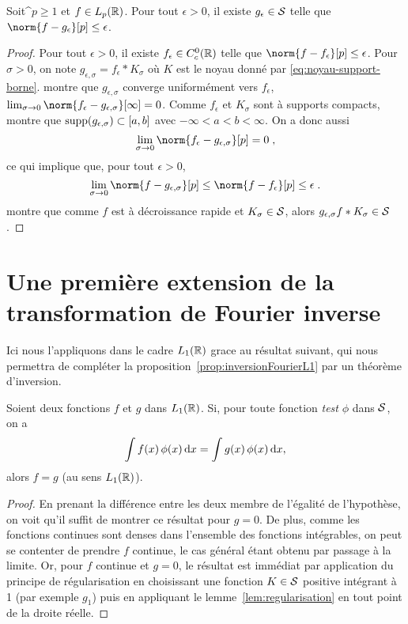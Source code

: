 \begin{theorem}
\label{theo:densite-mcs-Lp}
Soit^$p \geq 1$ et $f \in L_p(\mathbb{R})$. Pour tout $\epsilon > 0$, il existe $g_\epsilon \in \mathcal{S}$ telle que 
$\norm{f - g_\epsilon}[p] \leq \epsilon$.
\end{theorem}
\begin{proof}
Pour tout $\epsilon > 0$, il existe $f_\epsilon \in C_c^0(\mathbb{R})$ telle que $\norm{f - f_\epsilon}[p] \leq \epsilon$.
Pour $\sigma > 0$, on note $g_{\epsilon,\sigma} = f_\epsilon * K_\sigma$ où $K$ est le noyau donn\'e par \eqref{eq:noyau-support-borne}.  montre que $g_{\epsilon,\sigma}$ converge uniform\'ement vers $f_\epsilon$, \ie\ $\lim_{\sigma \to 0} \norm{f_\epsilon - g_{\epsilon,\sigma}}[\infty]= 0$. Comme $f_\epsilon$ et $K_\sigma$ sont à supports compacts,  montre que $\mathrm{supp}(g_{\epsilon,\sigma}) \subset \left[a,b\right]$ avec $-\infty < a < b < \infty$.
On a donc aussi 
$$
\lim_{\sigma \to 0} \norm{f_\epsilon - g_{\epsilon,\sigma}}[p] = 0 \eqsp,
$$
ce qui implique que, pour tout $\epsilon > 0$, 
$$
\lim_{\sigma \to 0} \norm{f - g_{\epsilon,\sigma}}[p] \leq \norm{f-f_\epsilon}[p] \leq \epsilon \eqsp.
$$
 montre que comme $f$ est à d\'ecroissance rapide et $K_\sigma \in \mathcal{S}$, alors $g_{\epsilon,\sigma} f * K_\sigma \in \mathcal{S}$.
\end{proof}


\section{Une premi\`ere extension de la transformation de Fourier inverse}
Ici nous l'appliquons dans le cadre $L_1(\mathbb{R})$ grace au r{\'e}sultat suivant, qui nous permettra de compl{\'e}ter la
proposition~\ref{prop:inversionFourierL1} par un th{\'e}or{\`e}me d'inversion.
\begin{proposition}\label{prop:DualiteSchwartz}
Soient deux fonctions $f$ et $g$ dans $L_1(\mathbb{R})$. Si, pour toute fonction \textit{test} $\phi$ dans $\mathcal{S}$, on a
$$
\int f(x)\,\phi(x)\,\mathrm{d} x= \int g(x)\,\phi(x)\,\mathrm{d} x,
$$
alors $f=g$ (au sens $L_1(\mathbb{R})$).
\end{proposition}
\begin{proof}
En prenant la diff{\'e}rence entre les deux membre de l'{\'e}galit{\'e} de l'hypoth{\`e}se, on voit qu'il suffit de montrer ce r{\'e}sultat pour
$g=0$. De plus, comme les fonctions continues sont denses dans l'ensemble des fonctions int\'egrables, on peut se contenter de prendre $f$ continue, le cas g{\'e}n{\'e}ral {\'e}tant
obtenu par passage {\`a} la limite. Or, pour $f$ continue et $g=0$, le r{\'e}sultat est imm{\'e}diat par application du principe de
r{\'e}gularisation en choisissant une fonction $K\in\mathcal{S}$ positive int{\'e}grant {\`a} 1 (par exemple $g_1$) puis en appliquant le
lemme~\ref{lem:regularisation} en tout point de la droite r{\'e}elle.
\end{proof}

